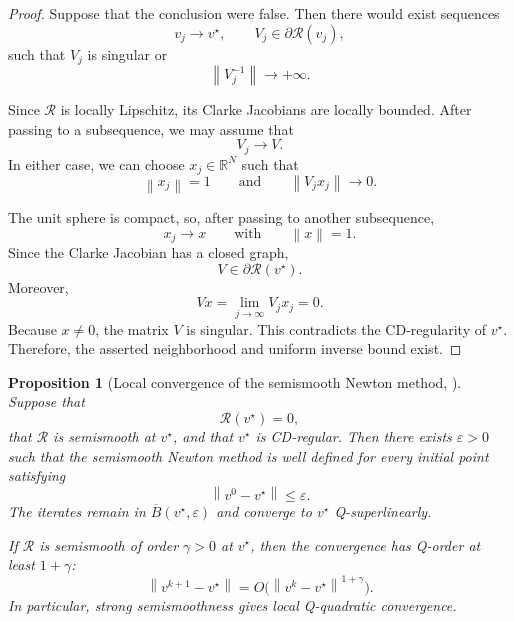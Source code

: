 \documentclass[a4paper,11pt]{book}
\theoremstyle{plain}
\newtheorem{proposition}[theorem]{Proposition}
\theoremstyle{definition}
\theoremstyle{remark}
\numberwithin{equation}{chapter}
\numberwithin{algorithm}{chapter}
\newcommand{\R}{\mathbb{R}}
\newcommand{\norm}[1]{\left\|#1\right\|}
\begin{document}
	\begin{proof}
		Suppose that the conclusion were false. Then there would exist sequences
		\[
		v_j\to v^\star,
		\qquad
		V_j\in\partial\mathcal R(v_j),
		\]
		such that \(V_j\) is singular or
		\[
		\norm{V_j^{-1}}\longrightarrow+\infty.
		\]
		
		
		Since \(\mathcal R\) is locally Lipschitz, its Clarke Jacobians are locally
		bounded. After passing to a subsequence, we may assume that
		\[
		V_j\to V.
		\]
		In either case, we can choose \(x_j\in\R^N\) such that
		\[
		\norm{x_j}=1
		\qquad\text{and}\qquad
		\norm{V_jx_j}\longrightarrow0.
		\]
		
		The unit sphere is compact, so, after passing to another subsequence,
		\[
		x_j\to x
		\qquad\text{with}\qquad
		\norm{x}=1.
		\]
		Since the Clarke Jacobian has a closed graph,
		\[
		V\in\partial\mathcal R(v^\star).
		\]
		Moreover,
		\[
		Vx
		=
		\lim_{j\to\infty}V_jx_j
		=
		0.
		\]
		Because \(x\neq0\), the matrix \(V\) is singular. This contradicts the
		CD-regularity of \(v^\star\). Therefore, the asserted neighborhood and
		uniform inverse bound exist.
	\end{proof}
	\begin{proposition}[Local convergence of the semismooth Newton method,
		\cite{QiSun1993}]
		Suppose that
		\[
		\mathcal R(v^\star)=0,
		\]
		that \(\mathcal R\) is semismooth at \(v^\star\), and that \(v^\star\) is
		CD-regular. Then there exists \(\varepsilon>0\) such that the semismooth
		Newton method is well defined for every initial point satisfying
		\[
		\norm{v^0-v^\star}\leq\varepsilon.
		\]
		The iterates remain in \(\overline B(v^\star,\varepsilon)\) and converge to
		\(v^\star\) Q-superlinearly.
		
		If \(\mathcal R\) is semismooth of order \(\gamma>0\) at \(v^\star\), then
		the convergence has Q-order at least \(1+\gamma\):
		\[
		\norm{v^{k+1}-v^\star}
		=
		O\bigl(\norm{v^k-v^\star}^{1+\gamma}\bigr).
		\]
		In particular, strong semismoothness gives local Q-quadratic convergence.
	\end{proposition}
	
\end{document}
